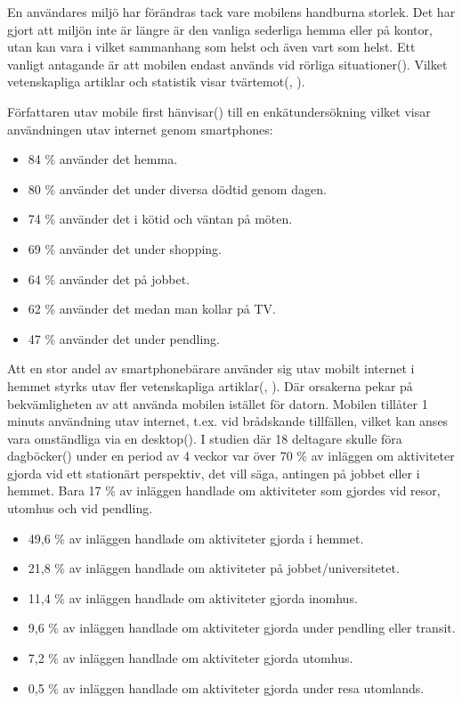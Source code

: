 \documentclass[11pt]{article}
\begin{document}
En användares miljö har förändras tack vare mobilens handburna storlek. Det har gjort att miljön inte är längre är den vanliga sederliga hemma eller på kontor, utan kan vara i vilket sammanhang som helst och även vart som helst. Ett vanligt antagande är att mobilen endast används vid rörliga situationer(\cite[s.12]{mobilefirstluke}). Vilket vetenskapliga artiklar och statistik visar tvärtemot(\cite{mobilewebsearch}, \cite{mobilefirstluke}).

Författaren utav mobile first hänvisar(\cite[s.12]{mobilefirstluke}) till en enkätundersökning vilket visar användningen utav internet genom smartphones:
\begin{itemize}
	\item{84 \% använder det hemma.}
	\item{80 \% använder det under diversa dödtid genom dagen.}
	\item{74 \% använder det i kötid och väntan på möten.}
	\item{69 \% använder det under shopping.}
	\item{64 \% använder det på jobbet.}
	\item{62 \% använder det medan man kollar på TV.}
	\item{47 \% använder det under pendling.}
\end{itemize}
\bigskip

Att en stor andel av smartphonebärare använder sig utav mobilt internet i hemmet styrks utav fler vetenskapliga artiklar(\cite{mobilewebsearch}, \cite{mobilefirstluke}). Där orsakerna pekar på bekvämligheten av att använda mobilen istället för datorn. Mobilen tillåter 1 minuts användning utav internet, t.ex. vid brådskande tillfällen, vilket kan anses vara omständliga via en desktop(\cite{mobilewebsearch}). I studien där 18 deltagare skulle föra dagböcker(\cite{mobilewebsearch}) under en period av 4 veckor var över 70 \% av inläggen om aktiviteter gjorda vid ett stationärt perspektiv, det vill säga, antingen på jobbet eller i hemmet. Bara 17 \% av inläggen handlade om aktiviteter som gjordes vid resor, utomhus och vid pendling.
\\
\begin{itemize}
	\item{49,6 \% av inläggen handlade om aktiviteter gjorda i hemmet.}
	\item{21,8 \% av inläggen handlade om aktiviteter på jobbet/universitetet.}
	\item{11,4 \% av inläggen handlade om aktiviteter gjorda inomhus.}
	\item{9,6 \% av inläggen handlade om aktiviteter gjorda under pendling eller transit.}
	\item{7,2 \% av inläggen handlade om aktiviteter gjorda utomhus.}
	\item{0,5 \% av inläggen handlade om aktiviteter gjorda under resa utomlands.}
\end{itemize}
\bigskip
\end{document}
